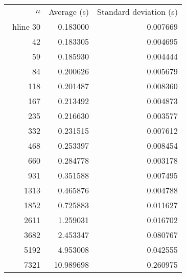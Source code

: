 \begin{tabular}{rrr}
$n$& Average (s) & Standard deviation (s)\\\ hline
30& 0.183000& 0.007669\\
42& 0.183305& 0.004695\\
59& 0.185930& 0.004444\\
84& 0.200626& 0.005679\\
118& 0.201487& 0.008360\\
167& 0.213492& 0.004873\\
235& 0.216630& 0.003577\\
332& 0.231515& 0.007612\\
468& 0.253397& 0.008454\\
660& 0.284778& 0.003178\\
931& 0.351588& 0.007495\\
1313& 0.465876& 0.004788\\
1852& 0.725883& 0.011627\\
2611& 1.259031& 0.016702\\
3682& 2.453347& 0.080767\\
5192& 4.953008& 0.042555\\
7321& 10.989698& 0.260975\\
\end{tabular}
